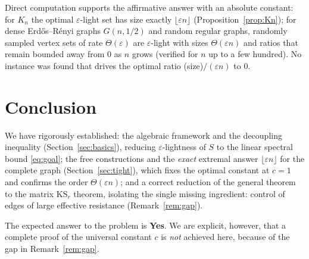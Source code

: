 \documentclass[12pt]{article}
\theoremstyle{definition}
\newcommand{\eps}{\varepsilon}
\begin{document}
Direct computation supports the affirmative answer with an absolute constant: for $K_n$ the optimal
$\eps$-light set has size exactly $\lfloor\eps n\rfloor$ (Proposition~\ref{prop:Kn}); for dense
Erd\H{o}s--R\'enyi graphs $G(n,1/2)$ and random regular graphs, randomly sampled vertex sets of rate
$\Theta(\eps)$ are $\eps$-light with sizes $\Theta(\eps n)$ and ratios that remain bounded away from
$0$ as $n$ grows (verified for $n$ up to a few hundred). No instance was found that drives the
optimal ratio (size)$/(\eps n)$ to $0$.

\section{Conclusion}\label{sec:concl}

We have rigorously established: the algebraic framework and the decoupling inequality
(Section~\ref{sec:basics}), reducing $\eps$-lightness of $S$ to the linear spectral bound
\eqref{eq:goal}; the free constructions and the \emph{exact} extremal answer $\lfloor\eps n\rfloor$
for the complete graph (Section~\ref{sec:tight}), which fixes the optimal constant at $c=1$ and
confirms the order $\Theta(\eps n)$; and a correct reduction of the general theorem to the matrix
$\mathrm{KS}_r$ theorem, isolating the single missing ingredient: control of edges of large effective
resistance (Remark~\ref{rem:gap}).

The expected answer to the problem is \textbf{Yes}. We are explicit, however, that a complete proof of
the universal constant $c$ is \emph{not} achieved here, because of the gap in Remark~\ref{rem:gap}.
\end{document}
